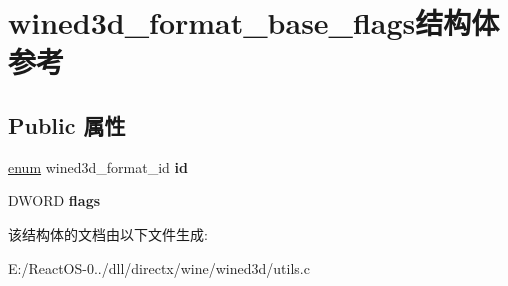 \hypertarget{structwined3d__format__base__flags}{}\section{wined3d\+\_\+format\+\_\+base\+\_\+flags结构体 参考}
\label{structwined3d__format__base__flags}
\subsection*{Public 属性}
\begin{DoxyCompactItemize}
\item 
\mbox{\label{structwined3d__format__base__flags_a6321bb15f69fa701ecb9f8ae630707b2}} 
\hyperlink{interfaceenum}{enum} wined3d\+\_\+format\+\_\+id {\bfseries id}
\item 
\mbox{\label{structwined3d__format__base__flags_aa0c900d6dd3dd2256339b3fa0693127d}} 
D\+W\+O\+RD {\bfseries flags}
\end{DoxyCompactItemize}


该结构体的文档由以下文件生成\+:\begin{DoxyCompactItemize}
\item 
E\+:/\+React\+O\+S-\/0../dll/directx/wine/wined3d/utils.\+c\end{DoxyCompactItemize}
